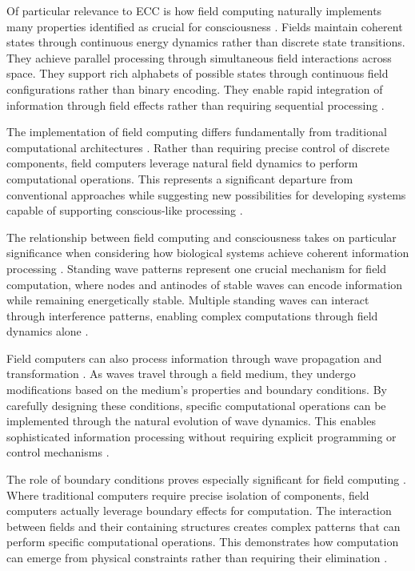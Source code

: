Of particular relevance to ECC is how field computing naturally implements many properties identified as crucial for consciousness \cite{Pribram2017}. Fields maintain coherent states through continuous energy dynamics rather than discrete state transitions. They achieve parallel processing through simultaneous field interactions across space. They support rich alphabets of possible states through continuous field configurations rather than binary encoding. They enable rapid integration of information through field effects rather than requiring sequential processing \cite{Raychowdhury2020}.

The implementation of field computing differs fundamentally from traditional computational architectures \cite{Verschure2019}. Rather than requiring precise control of discrete components, field computers leverage natural field dynamics to perform computational operations. This represents a significant departure from conventional approaches while suggesting new possibilities for developing systems capable of supporting conscious-like processing \cite{Werbos2018}.

The relationship between field computing and consciousness takes on particular significance when considering how biological systems achieve coherent information processing \cite{Bandyopadhyay2020}. Standing wave patterns represent one crucial mechanism for field computation, where nodes and antinodes of stable waves can encode information while remaining energetically stable. Multiple standing waves can interact through interference patterns, enabling complex computations through field dynamics alone \cite{Calude2018b}.

Field computers can also process information through wave propagation and transformation \cite{Chua2017}. As waves travel through a field medium, they undergo modifications based on the medium's properties and boundary conditions. By carefully designing these conditions, specific computational operations can be implemented through the natural evolution of wave dynamics. This enables sophisticated information processing without requiring explicit programming or control mechanisms \cite{Fromherz2019}.

The role of boundary conditions proves especially significant for field computing \cite{Haken2020}. Where traditional computers require precise isolation of components, field computers actually leverage boundary effects for computation. The interaction between fields and their containing structures creates complex patterns that can perform specific computational operations. This demonstrates how computation can emerge from physical constraints rather than requiring their elimination \cite{McFadden2018}.


